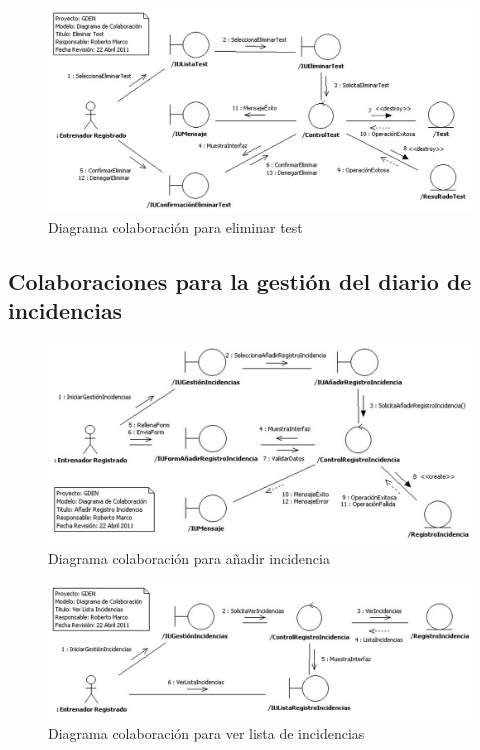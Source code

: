 			\begin{figure}[H]
			  \centering
			    \includegraphics[width=16cm]{./eps/colaboraciones/gestion_test/EliminarTest.eps}
			  \caption{Diagrama colaboración para eliminar test}
			  \label{fig:col_eliminar_test}
			\end{figure}
		
		
		\subsection{Colaboraciones para la gestión del diario de incidencias} %
			\label{sub:colaboraciones_para_la_gestion_del_diario_de_incidencias}
			
			\begin{figure}[H]
			  \centering
			    \includegraphics[width=16cm]{./eps/colaboraciones/gestion_diarioincidencia/AnadirRegistroIncidencia.eps}
			  \caption{Diagrama colaboración para añadir incidencia}
			  \label{fig:col_anadir_incidencia}
			\end{figure}
			
			\begin{figure}[H]
			  \centering
			    \includegraphics[width=16cm]{./eps/colaboraciones/gestion_diarioincidencia/VerListaRegistroIncidencias.eps}
			  \caption{Diagrama colaboración para ver lista de incidencias}
			  \label{fig:col_ver_lista_incidencias}
			\end{figure}
			
